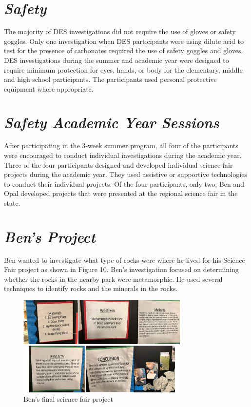 \documentclass[11pt]{sig-alternate}
\begin{document}
\begin{large}
\section*{\textit{Safety}}
The majority of DES investigations did not require the use of gloves or safety goggles. Only one investigation when DES participants were using dilute acid to test for the presence of carbonates required the use of safety goggles and gloves. DES investigations during the summer and academic year were designed to require minimum protection for eyes, hands, or body for the elementary, middle and high school participants. The participants used personal protective equipment where appropriate. 
\section*{\textit{Safety Academic Year Sessions}}
After participating in the 3-week summer program, all four of the participants were encouraged to conduct individual investigations during the academic year. Three of the four participants designed and developed individual science fair projects during the academic year. They used assistive or supportive technologies to conduct their individual projects. Of the four participants, only two, Ben and Opal developed projects that were presented at the regional science fair in the state.  
\section*{\textit{Ben’s Project}} 
Ben wanted to investigate what type of rocks were where he lived for his Science Fair project as shown in Figure 10.  Ben’s investigation focused on determining whether the rocks in the nearby park were metamorphic. He used several techniques to identify rocks and the minerals in the rocks. 

{\begin{figure}[htp] 
    \leftmargin
    \includegraphics[width=8.5cm]{figure10.png}
    \caption{Ben’s  final science fair project }
    \label{ Ben’s  final science fair project }
\end{figure}
}

\end{large}
\end{document}

